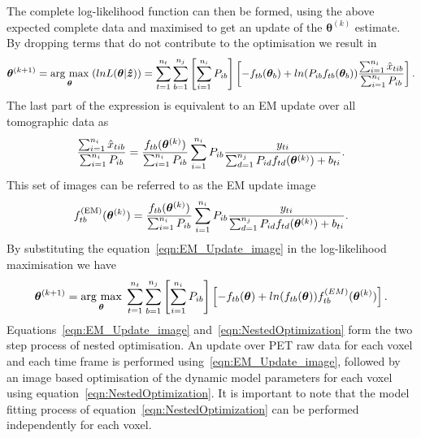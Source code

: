 The complete log-likelihood function can then be formed, using the above expected complete data and maximised to get an update of the $\bm\theta^{(k)}$ estimate. By dropping terms that do not contribute to the optimisation we result in
\begin{equation}
\bm{\theta}^{(k+1)} = \underset{\bm{\theta}}{\operatorname{arg}\,\operatorname{max}}\;(lnL(\bm{\theta}|\bm{\hat{z}})) = 
\sum_{t=1}^{n_t} \sum_{b=1}^{n_j} \left[ \sum_{i=1}^{n_i}  P_{ib} \right]
\left[ -f_{tb}(\bm\theta_b) + 
ln(P_{ib} f_{tb}(\bm\theta_b)) 
\frac{\sum_{i=1}^{n_i} \hat{x}_{tib} }
{ \sum_{i=1}^{n_i}  P_{ib} }
\right] \\ .
\end{equation}
The last part of the expression is equivalent to an EM update over all tomographic data as 
\begin{equation}
\frac{\sum_{i=1}^{n_i} \hat{x}_{tib} }
{\sum_{i=1}^{n_i}  P_{ib}}  =
\frac{f_{tb}(\bm\theta^{(k)})}{\sum_{i=1}^{n_i}  P_{ib}}
\sum_{i=1}^{n_i} P_{ib}
\frac{y_{ti}}
{\sum_{d=1}^{n_j} P_{id} f_{td}(\bm\theta^{(k)}) + b_{ti}}\\.
\end{equation}
This set of images can be referred to as the EM update image
\begin{equation}
f_{tb}^{(\textrm{EM})}(\bm{\theta}^{(k)}) = 
\frac{f_{tb}(\bm\theta^{(k)})}{\sum_{i=1}^{n_i}  P_{ib}}
\sum_{i=1}^{n_i} P_{ib}
\frac{y_{ti}}
{\sum_{d=1}^{n_j} P_{id} f_{td}(\bm\theta^{(k)}) + b_{ti}}\\.
\label{eqn:EM_Update_image}
\end{equation}
By substituting the equation~\ref{eqn:EM_Update_image} in the log-likelihood maximisation we have
\begin{equation}
\bm{\theta}^{(k+1)} = 
\underset{\bm{\theta}}{\operatorname{arg}\,\operatorname{max}}\;
\sum_{t=1}^{n_t} \sum_{b=1}^{n_j} \left[ \sum_{i=1}^{n_i}  P_{ib} \right]
\left[ -f_{tb}(\bm\theta) + 
ln( f_{tb}(\bm\theta)) 
f_{tb}^{(EM)}(\bm{\theta}^{(k)})
\right] \\ .
\label{eqn:NestedOptimization}
\end{equation}
Equations~\ref{eqn:EM_Update_image} and~\ref{eqn:NestedOptimization} form the two step process of nested optimisation. An update over PET raw data for each voxel and each time frame is performed using~\ref{eqn:EM_Update_image}, followed by an image based optimisation of the dynamic model parameters for each voxel using equation~\ref{eqn:NestedOptimization}. It is important to note that the model fitting process of equation~\ref{eqn:NestedOptimization} can be performed independently for each voxel.
%
